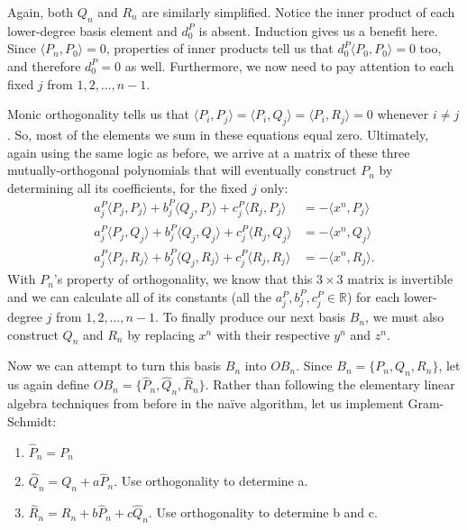 \documentclass[letterpaper, 12pt]{article}
\begin{document}
\vspace*{6mm}
\noindent Again, both $Q_n$ and $R_n$ are similarly simplified. Notice the inner product of each lower-degree basis element and $d_0^P$ is absent. Induction gives us a benefit here. Since $\langle P_n, P_0\rangle = 0$, properties of inner products tell us that $d_0^P\langle P_0, P_0\rangle = 0$ too, and therefore $d_0^P = 0$ as well. Furthermore, we now need to pay attention to each fixed $j$ from $1, 2, \ldots, n-1$.

Monic orthogonality tells us that $\langle P_i, P_j\rangle = \langle P_i, Q_j\rangle = \langle P_i, R_j\rangle = 0$ whenever $i \neq j$. So, most of the elements we sum in these equations equal zero. Ultimately, again using the same logic as before, we arrive at a matrix of these three mutually-orthogonal polynomials that will eventually construct $P_n$ by determining all its coefficients, for the fixed $j$ only:
\begin{align*}
	a_j^P\langle P_j, P_j \rangle + b_j^P\langle Q_j, P_j \rangle + c_j^P\langle R_j, P_j \rangle &= - \langle x^n, P_j\rangle \\
	a_j^P\langle P_j, Q_j \rangle + b_j^P\langle Q_j, Q_j \rangle + c_j^P\langle R_j, Q_j \rangle &= - \langle x^n, Q_j\rangle \\
	a_j^P\langle P_j, R_j \rangle + b_j^P\langle Q_j, R_j \rangle + c_j^P\langle R_j, R_j \rangle&= - \langle x^n, R_j\rangle.
\end{align*}
\noindent With $P_n$'s property of orthogonality, we know that this $3\times 3$ matrix is invertible and we can calculate all of its constants (all the $a_j^P, b_j^P, c_j^P \in \mathbb{R}$) for each lower-degree $j$ from $1, 2,\ldots,n-1$. To finally produce our next basis $B_n$, we must also construct $Q_n$ and $R_n$ by replacing $x^n$ with their respective $y^n$ and $z^n$.

Now we can attempt to turn this basis $B_n$ into $OB_n$. Since $B_n = \{P_n, Q_n, R_n\}$, let us again define $OB_n = \{\hat{P}_n, \hat{Q}_n, \hat{R}_n\}$. Rather than following the elementary linear algebra techniques from before in the na\"ive algorithm, let us implement Gram-Schmidt:

\vspace*{-1mm}
\singlespacing
\begin{enumerate}
	\item $\hat{P}_n = P_n$
	\item $\hat{Q}_n = Q_n + a\hat{P}_n$. Use orthogonality to determine a.
	\item $\hat{R}_n = R_n + b\hat{P}_n + c\hat{Q}_n$. Use orthogonality to determine b and c.
\end{enumerate}
\end{document}
